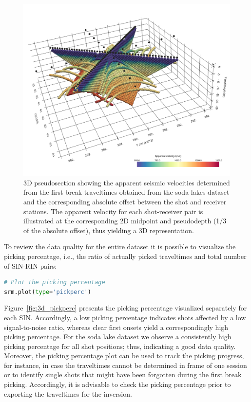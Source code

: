 \documentclass[a4paper,fleqn]{cas-sc}
\begin{document}
\begin{figure}
	\centering
	\includegraphics[width=.75\textwidth]{figures/3d_pseudosection.pdf}
	\caption{3D pseudosection showing the apparent seismic velocities determined from the first break traveltimes obtained from the soda lakes dataset and the corresponding absolute offset between the shot and receiver stations. The apparent velocity for each shot-receiver pair is illustrated at the corresponding 2D midpoint and pseudodepth (1/3 of the absolute offset), thus yielding a 3D representation.}
	\label{fig:3d_pseudosection}
\end{figure}

To review the data quality for the entire dataset it is possible to visualize the picking percentage, i.e., the ratio of actually picked traveltimes and total number of SIN-RIN pairs:
\begin{lstlisting}[language=Python, firstnumber=10]
# Plot the picking percentage
srm.plot(type='pickperc')
\end{lstlisting}
Figure~\ref{fig:3d_pickperc} presents the picking percentage visualized separately for each SIN. Accordingly, a low picking percentage indicates shots affected by a low signal-to-noise ratio, whereas clear first onsets yield a correspondingly high picking percentage. For the soda lake dataset we observe a consistently high picking percentage for all shot positions; thus, indicating a good data quality.
Moreover, the picking percentage plot can be used to track the picking progress, for instance, in case the traveltimes cannot be determined in frame of one session or to identify single shots that might have been forgotten during the first break picking. Accordingly, it is advisable to check the picking percentage prior to exporting the traveltimes for the inversion.
\end{document}
